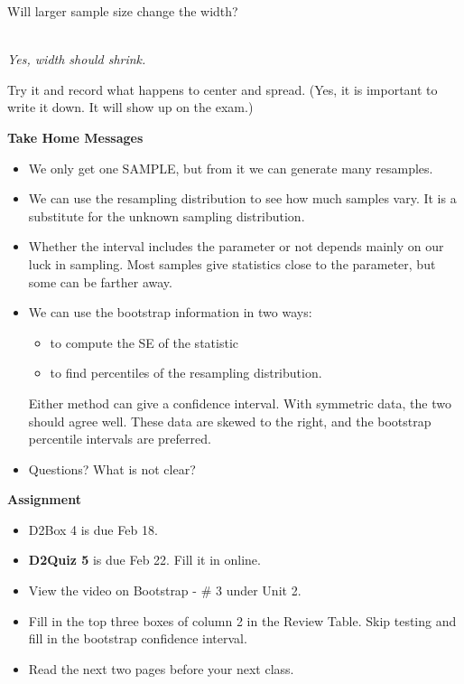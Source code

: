 \begin{enumerate}
   Will larger sample size  change the width?\\
\begin{students}
        \vspace{.5cm}        
\end{students}
\begin{key}
\\ {\it Yes, width should shrink.}
\end{key}

   Try it and record what happens to center and spread.  (Yes, it is
   important to write it down. It will show up on the exam.)
   \vfill
\end{enumerate}

\begin{center}
  {\bf Take Home Messages}
\end{center}
\begin{itemize}
  \item   We only get one SAMPLE, but from it we can generate many
    resamples.
  \item We can use the resampling distribution to see how much
    samples vary. It is a substitute for the unknown sampling
    distribution.
  \item Whether the interval includes the parameter or not
    depends mainly on our luck in sampling.  Most samples give statistics
    close to the parameter, but some can be farther away.
  \item We can use the bootstrap information in two ways:
    \begin{itemize}
    \item to compute the SE of the statistic
    \item to find percentiles of the resampling distribution.
    \end{itemize}
   Either method can give a confidence interval.  With symmetric data, the
   two should agree well.  These data are skewed to the right, and the
   bootstrap percentile intervals are preferred.
 \item 
  Questions?  What is not clear?\vfill
  \end{itemize}
  

\noindent
{\bf Assignment} \vspace{-.2in}
\begin{itemize}
\item D2Box 4 is due Feb 18. 
\item {\bf D2Quiz 5} is due Feb 22.  Fill it in online.
 \item View the video on Bootstrap - \# 3 under Unit 2.
 \item Fill in the top three boxes of column 2 in the Review
   Table. Skip testing and fill in the bootstrap confidence interval. 
\item Read the next two pages before your next class.
\end{itemize}

